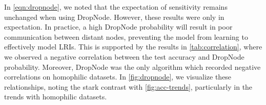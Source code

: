 In \autoref{eqn:dropnode}, we noted that the expectation of sensitivity remains unchanged when using DropNode. However, these results were only in expectation. In practice, a high DropNode probability will result in poor communication between distant nodes, preventing the model from learning to effectively model LRIs. This is supported by the results in \autoref{tab:correlation}, where we observed a negative correlation between the test accuracy and DropNode probability. Moreover, DropNode was the only algorithm which recorded negative correlations on homophilic datasets. In \autoref{fig:dropnode}, we visualize these relationships, noting the stark contrast with \autoref{fig:acc-trends}, particularly in the trends with homophilic datasets.